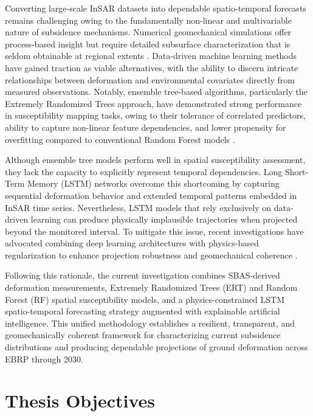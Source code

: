 \documentclass[oneside,doublespacing,flushright]{lsuthesis}
\begin{document}
Converting large-scale InSAR datasets into dependable spatio-temporal forecasts remains challenging owing to the fundamentally non-linear and multivariable nature of subsidence mechanisms. 
Numerical geomechanical simulations offer process-based insight but require detailed subsurface characterization that is seldom obtainable at regional extents \citep{Zhou2022}. 
Data-driven machine learning methods have gained traction as viable alternatives, with the ability to discern intricate relationships between deformation and environmental covariates directly from measured observations. 
Notably, ensemble tree-based algorithms, particularly the Extremely Randomized Trees approach, have demonstrated strong performance in susceptibility mapping tasks, owing to their tolerance of correlated 
predictors, ability to capture non-linear feature dependencies, and lower propensity for overfitting compared to conventional Random Forest models \citep{HosseinzadehLLand2024}.

Although ensemble tree models perform well in spatial susceptibility assessment, they lack the capacity to explicitly represent temporal dependencies. 
Long Short-Term Memory (LSTM) networks overcome this shortcoming by capturing sequential deformation behavior and extended temporal 
patterns embedded in InSAR time series. Nevertheless, LSTM models that rely exclusively on data-driven learning can produce physically implausible trajectories when 
projected beyond the monitored interval. To mitigate this issue, recent investigations have advocated combining deep 
learning architectures with physics-based regularization to enhance projection robustness and geomechanical coherence \citep{Zhu2024}.

Following this rationale, the current investigation combines SBAS-derived deformation measurements, Extremely Randomized Trees (ERT) and Random Forest (RF) spatial susceptibility models, 
and a physics-constrained LSTM spatio-temporal forecasting strategy augmented with explainable artificial intelligence. This unified methodology 
establishes a resilient, transparent, and geomechanically coherent framework for characterizing current subsidence distributions and producing dependable
projections of ground deformation across EBRP through 2030.



\section{Thesis Objectives}
\label{sec:objectives}
\end{document}
